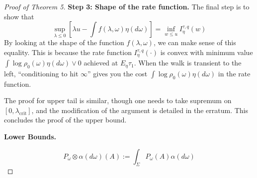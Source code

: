 \begin{proof}[Proof of Theorem 5]
\textbf{Step 3: Shape of the rate function.}
The final step is to show that
\[
	\sup_{\lambda \le 0} \left[ \lambda u - \int f(\lambda, \omega) \eta(d \omega)\right] = \inf_{w \leq u} I_\eta^{\tau, q}(w)
\]
By looking at the shape of the function $f(\lambda, \omega)$, we can make sense of this equality. This is because the rate function $I_\eta^{\tau, q}(\cdot)$ is convex with minimum value {\color{orange}$\int \log \rho_0(\omega) \eta(d \omega) \vee 0$} achieved at $E_\eta \tau_1$. When the walk is transient to the left, ``conditioning to hit $\infty$'' gives you the cost $\int \log \rho_0(\omega) \eta(d \omega)$ in the rate function.

The proof for upper tail is similar, though one needs to take supremum on $[0, \lambda_{\text{crit}}]$, and the modification of the argument is detailed in the erratum. \followup
This concludes the proof of the upper bound.

\textbf{Lower Bounds.}


	\[
	P_\omega \otimes \alpha(d \omega) (A) := \int_\Sigma P_\omega(A) \alpha(d \omega)
	\]

\end{proof}

